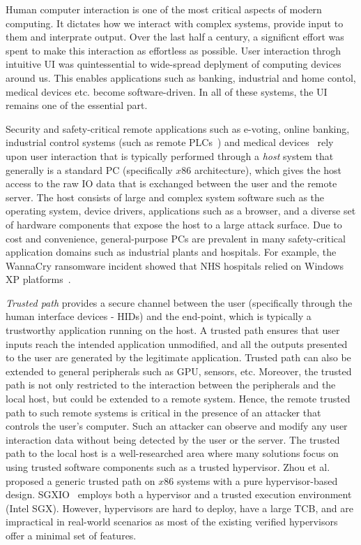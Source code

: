 
Human computer interaction is one of the most critical aspects of modern computing. It dictates how we interact with complex systems, provide input to them and interprate output. Over the last half a century, a significnt effort was spent to make this interaction as effortless as possible. User interaction throgh intuitive UI was quintessential to wide-spread deplyment of computing devices around us. This enables applications such as banking, industrial and home contol, medical devices etc. become software-driven. In all of these systems, the UI remains one of the essential part.  

Security and safety-critical remote applications such as e-voting, online banking, industrial control systems (such as remote PLCs~\cite{controlbyweb}) and medical devices~\cite{medicalDevice} rely upon user interaction that is typically performed through a \emph{host} system that generally is a standard PC (specifically $x86$ architecture), which gives the host access to the raw IO data that is exchanged between the user and the remote server. The host consists of large and complex system software such as the operating system, device drivers, applications such as a browser, and a diverse set of hardware components that expose the host to a large attack surface. Due to cost and convenience, general-purpose PCs are prevalent in many safety-critical application domains such as industrial plants and hospitals. For example, the WannaCry ransomware incident showed that NHS hospitals relied on Windows XP platforms~\cite{berry_2017,field_wannacry_2018}. 


\emph{Trusted path} provides a secure channel between the user (specifically through the human interface devices - HIDs) and the end-point, which is typically a trustworthy application running on the host. A trusted path ensures that user inputs reach the intended application unmodified, and all the outputs presented to the user are generated by the legitimate application. Trusted path can also be extended to general peripherals such as GPU, sensors, etc. Moreover, the trusted path is not only restricted to the interaction between the peripherals and the local host, but could be extended to a remote system. Hence, the remote trusted path to such remote systems is critical in the presence of an attacker that controls the user's computer. Such an attacker can observe and modify any user interaction data without being detected by the user or the server. The trusted path to the local host is a well-researched area where many solutions focus on using trusted software components such as a trusted hypervisor. Zhou et al.~\cite{zhou2012building} proposed a generic trusted path on $x86$ systems with a pure hypervisor-based design. SGXIO~\cite{weiser2017sgxio} employs both a hypervisor and a trusted execution environment (Intel SGX). However, hypervisors are hard to deploy, have a large TCB, and are impractical in real-world scenarios as most of the existing verified hypervisors offer a minimal set of features.  


